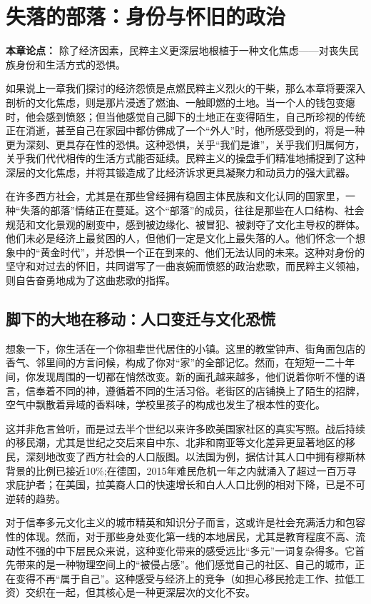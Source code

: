 \chapter{失落的部落：身份与怀旧的政治}

\textbf{本章论点：} 除了经济因素，民粹主义更深层地根植于一种文化焦虑——对丧失民族身份和生活方式的恐惧。

如果说上一章我们探讨的经济怨愤是点燃民粹主义烈火的干柴，那么本章将要深入剖析的文化焦虑，则是那片浸透了燃油、一触即燃的土地。当一个人的钱包变瘪时，他会感到愤怒；但当他感觉自己脚下的土地正在变得陌生，自己所珍视的传统正在消逝，甚至自己在家园中都仿佛成了一个“外人”时，他所感受到的，将是一种更为深刻、更具存在性的恐惧。这种恐惧，关乎“我们是谁”，关乎我们归属何方，关乎我们代代相传的生活方式能否延续。民粹主义的操盘手们精准地捕捉到了这种深层的文化焦虑，并将其锻造成了比经济诉求更具凝聚力和动员力的强大武器。

在许多西方社会，尤其是在那些曾经拥有稳固主体民族和文化认同的国家里，一种“失落的部落”情结正在蔓延。这个“部落”的成员，往往是那些在人口结构、社会规范和文化景观的剧变中，感到被边缘化、被冒犯、被剥夺了文化主导权的群体。他们未必是经济上最贫困的人，但他们一定是文化上最失落的人。他们怀念一个想象中的“黄金时代”，并恐惧一个正在到来的、他们无法认同的未来。这种对身份的坚守和对过去的怀旧，共同谱写了一曲哀婉而愤怒的政治悲歌，而民粹主义领袖，则自告奋勇地成为了这曲悲歌的指挥。

\section{脚下的大地在移动：人口变迁与文化恐慌}

想象一下，你生活在一个你祖辈世代居住的小镇。这里的教堂钟声、街角面包店的香气、邻里间的方言问候，构成了你对“家”的全部记忆。然而，在短短一二十年间，你发现周围的一切都在悄然改变。新的面孔越来越多，他们说着你听不懂的语言，信奉着不同的神，遵循着不同的生活习俗。老街区的店铺换上了陌生的招牌，空气中飘散着异域的香料味，学校里孩子的构成也发生了根本性的变化。

这并非危言耸听，而是过去半个世纪以来许多欧美国家社区的真实写照。战后持续的移民潮，尤其是世纪之交后来自中东、北非和南亚等文化差异更显著地区的移民，深刻地改变了西方社会的人口版图。以法国为例，据估计其人口中拥有穆斯林背景的比例已接近10\%;在德国，2015年难民危机一年之内就涌入了超过一百万寻求庇护者；在美国，拉美裔人口的快速增长和白人人口比例的相对下降，已是不可逆转的趋势。

对于信奉多元文化主义的城市精英和知识分子而言，这或许是社会充满活力和包容性的体现。然而，对于那些身处变化第一线的本地居民，尤其是教育程度不高、流动性不强的中下层民众来说，这种变化带来的感受远比“多元”一词复杂得多。它首先带来的是一种物理空间上的“被侵占感”。他们感觉自己的社区、自己的城市，正在变得不再“属于自己”。这种感受与经济上的竞争（如担心移民抢走工作、拉低工资）交织在一起，但其核心是一种更深层次的文化不安。

